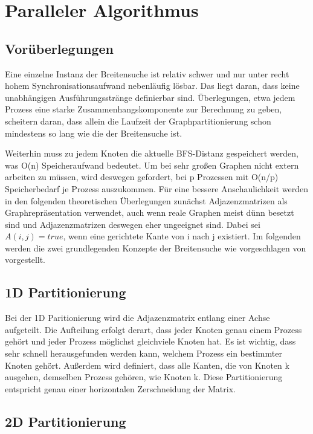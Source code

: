 \chapter{Paralleler Algorithmus} %
\label{cha:paralleler_algorithmus}

\section{Vorüberlegungen} %
\label{sec:vor_berlegungen}
Eine einzelne Instanz der Breitensuche ist relativ schwer und nur unter recht hohem Synchronisationsaufwand nebenläufig lösbar. Das liegt daran, dass keine unabhängigen Ausführungsstränge definierbar sind. Überlegungen, etwa jedem Prozess eine starke Zusammenhangskomponente zur Berechnung zu geben, scheitern daran, dass allein die Laufzeit der Graphpartitionierung schon mindestens so lang wie die der Breitensuche ist.

Weiterhin muss zu jedem Knoten die aktuelle BFS-Distanz gespeichert werden, was O(n) Speicheraufwand bedeutet. Um bei sehr großen Graphen nicht extern arbeiten zu müssen, wird deswegen gefordert, bei p Prozessen mit O(n/p) Speicherbedarf je Prozess auszukommen. Für eine bessere Anschaulichkeit werden in den folgenden theoretischen Überlegungen zunächst Adjazenzmatrizen als Graphrepräsentation verwendet, auch wenn reale Graphen meist dünn besetzt sind und Adjazenzmatrizen deswegen eher ungeeignet sind. Dabei sei $A(i,j) = true$, wenn eine gerichtete Kante von i nach j existiert. Im folgenden werden die zwei grundlegenden Konzepte der Breitensuche wie vorgeschlagen von \cite{Buluc:2011} vorgestellt.

\section{1D Partitionierung} %
\label{sec:1d_partitionierung}
Bei der 1D Paritionierung wird die Adjazenzmatrix entlang einer Achse aufgeteilt. Die Aufteilung erfolgt derart, dass jeder Knoten genau einem Prozess gehört und jeder Prozess möglichst gleichviele Knoten hat. Es ist wichtig, dass sehr schnell herausgefunden werden kann, welchem Prozess ein bestimmter Knoten gehört. Außerdem wird definiert, dass alle Kanten, die von Knoten k ausgehen, demselben Prozess gehören, wie Knoten k. Diese Partitionierung entspricht genau einer horizontalen Zerschneidung der Matrix.

\section{2D Partitionierung} %
\label{sec:2d_partitionierung}

